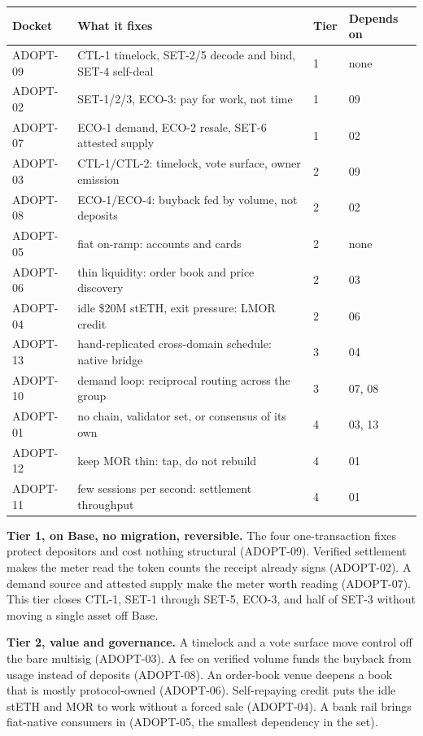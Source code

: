 \documentclass[11pt,a4paper]{article}
\begin{document}
\begin{center}\small
\begin{tabular}{@{}llll@{}}
\toprule
\textbf{Docket} & \textbf{What it fixes} & \textbf{Tier} & \textbf{Depends on} \\
\midrule
ADOPT-09 & CTL-1 timelock, SET-2/5 decode and bind, SET-4 self-deal & 1 & none \\
ADOPT-02 & SET-1/2/3, ECO-3: pay for work, not time & 1 & 09 \\
ADOPT-07 & ECO-1 demand, ECO-2 resale, SET-6 attested supply & 1 & 02 \\
\midrule
ADOPT-03 & CTL-1/CTL-2: timelock, vote surface, owner emission & 2 & 09 \\
ADOPT-08 & ECO-1/ECO-4: buyback fed by volume, not deposits & 2 & 02 \\
ADOPT-05 & fiat on-ramp: accounts and cards & 2 & none \\
ADOPT-06 & thin liquidity: order book and price discovery & 2 & 03 \\
ADOPT-04 & idle \$20M stETH, exit pressure: LMOR credit & 2 & 06 \\
\midrule
ADOPT-13 & hand-replicated cross-domain schedule: native bridge & 3 & 04 \\
ADOPT-10 & demand loop: reciprocal routing across the group & 3 & 07, 08 \\
\midrule
ADOPT-01 & no chain, validator set, or consensus of its own & 4 & 03, 13 \\
ADOPT-12 & keep MOR thin: tap, do not rebuild & 4 & 01 \\
ADOPT-11 & few sessions per second: settlement throughput & 4 & 01 \\
\bottomrule
\end{tabular}
\end{center}

\textbf{Tier 1, on Base, no migration, reversible.} The four one-transaction fixes protect
depositors and cost nothing structural (ADOPT-09). Verified settlement makes the meter read the
token counts the receipt already signs (ADOPT-02). A demand source and attested supply make the
meter worth reading (ADOPT-07). This tier closes CTL-1, SET-1 through SET-5, ECO-3, and half of
SET-3 without moving a single asset off Base.

\textbf{Tier 2, value and governance.} A timelock and a vote surface move control off the bare
multisig (ADOPT-03). A fee on verified volume funds the buyback from usage instead of deposits
(ADOPT-08). An order-book venue deepens a book that is mostly protocol-owned (ADOPT-06).
Self-repaying credit puts the idle stETH and MOR to work without a forced sale (ADOPT-04). A
bank rail brings fiat-native consumers in (ADOPT-05, the smallest dependency in the set).
\end{document}

